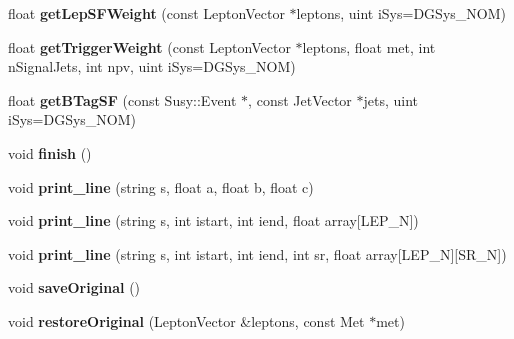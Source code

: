 \begin{DoxyCompactItemize}
\item 
\hypertarget{classSusyBaseAna_aad612e1174deda592686352ffaa29bc3}{
float {\bfseries getLepSFWeight} (const LeptonVector $\ast$leptons, uint iSys=DGSys\_\-NOM)}
\label{classSusyBaseAna_aad612e1174deda592686352ffaa29bc3}

\item 
\hypertarget{classSusyBaseAna_a92a852f309b7fbd33468f2a5f83c787f}{
float {\bfseries getTriggerWeight} (const LeptonVector $\ast$leptons, float met, int nSignalJets, int npv, uint iSys=DGSys\_\-NOM)}
\label{classSusyBaseAna_a92a852f309b7fbd33468f2a5f83c787f}

\item 
\hypertarget{classSusyBaseAna_a65224353aae95449d5b6dd790d9f1768}{
float {\bfseries getBTagSF} (const Susy::Event $\ast$, const JetVector $\ast$jets, uint iSys=DGSys\_\-NOM)}
\label{classSusyBaseAna_a65224353aae95449d5b6dd790d9f1768}

\item 
\hypertarget{classSusyBaseAna_a49853feb82dbd4a1ef9a012c2bbf58e5}{
void {\bfseries finish} ()}
\label{classSusyBaseAna_a49853feb82dbd4a1ef9a012c2bbf58e5}

\item 
\hypertarget{classSusyBaseAna_a275dcbcfe10ff6cbdee5dd2217ae8995}{
void {\bfseries print\_\-line} (string s, float a, float b, float c)}
\label{classSusyBaseAna_a275dcbcfe10ff6cbdee5dd2217ae8995}

\item 
\hypertarget{classSusyBaseAna_a7264ac8641bb1592be5be230c0b5e099}{
void {\bfseries print\_\-line} (string s, int istart, int iend, float array\mbox{[}LEP\_\-N\mbox{]})}
\label{classSusyBaseAna_a7264ac8641bb1592be5be230c0b5e099}

\item 
\hypertarget{classSusyBaseAna_ae3eb899634929fe37035f00bec252e02}{
void {\bfseries print\_\-line} (string s, int istart, int iend, int sr, float array\mbox{[}LEP\_\-N\mbox{]}\mbox{[}SR\_\-N\mbox{]})}
\label{classSusyBaseAna_ae3eb899634929fe37035f00bec252e02}

\item 
\hypertarget{classSusyBaseAna_acf83b46b750b0832b43cedbb09c9529e}{
void {\bfseries saveOriginal} ()}
\label{classSusyBaseAna_acf83b46b750b0832b43cedbb09c9529e}

\item 
\hypertarget{classSusyBaseAna_a8428b73112a64359f58791c557ee3f63}{
void {\bfseries restoreOriginal} (LeptonVector \&leptons, const Met $\ast$met)}
\label{classSusyBaseAna_a8428b73112a64359f58791c557ee3f63}


\end{DoxyCompactItemize}
